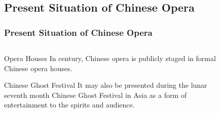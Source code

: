 \documentclass[pdflatex,compress,8pt,
	xcolor={dvipsnames,dvipsnames,svgnames,x11names,table},
	hyperref={	
	breaklinks = true, 
	pdfauthor={Lemenkova Polina}, 
	pdfsubject={Preentation}, 
	pdfcreator={Lemenkova Polina}, 
	pdfproducer={Lemenkova Polina}, 
	colorlinks=true,
	linkcolor=NavyBlue, 
	citecolor=NavyBlue, 
	urlcolor = NavyBlue, 
	breaklinks = true}]{beamer}
\begin{document}
\subsection{Present Situation of Chinese Opera}
\begin{frame}\frametitle{Present Situation of Chinese Opera}
	\begin{minipage}[0.4\textheight]{\textwidth}
		\begin{columns}[T]
			\begin{column}{0.5\textwidth}
			\vspace{4em}
			\begin{alertblock}{Opera Houses}
	In  century, Chinese opera is publicly staged in formal Chinese opera houses.
			\end{alertblock}
	
			\begin{block}{Chinese Ghost Festival}
	It may also be presented during the lunar seventh month Chinese Ghost Festival in Asia as a form of entertainment to the spirits and audience.
			\end{block}
			\end{column}
			\begin{column}{0.5\textwidth}
				\begin{figure}[H]
					\centering
							\hspace{1mm}
				\end{figure}
			\end{column}
		\end{columns}
	\end{minipage}
\end{frame}
\end{document}
